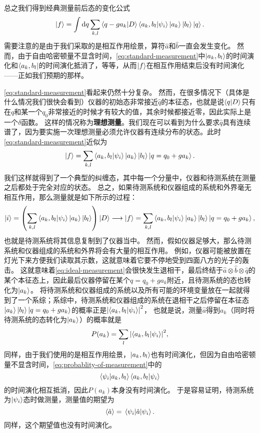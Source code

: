 \documentclass[hyperref, UTF8, a4paper]{ctexart}
\begin{document}
总之我们得到经典测量前后态的变化公式
\begin{equation}
    \ket{f} = \int \dd{q} \sum_{k, l} \braket{q - g a_k}{D} \braket{a_k, b_l}{\psi_i} \ket{a_k} \ket{b_l} \ket{q}.
    \label{eq:standard-measurement}
\end{equation}
需要注意的是由于我们采取的是相互作用绘景，算符$\hat{a}$和$\hat{b}$一直会发生变化。
然而，由于自由哈密顿量不显含时间，\eqref{eq:standard-measurement}中$\ket{a_k, b_l}$的时间演化和$\bra{a_k, b_l}$的时间演化抵消了，等等，从而$\ket{f}$在相互作用结束后没有时间演化——正如我们预期的那样。

\eqref{eq:standard-measurement}看起来仍然十分复杂。
然而，在很多情况下（具体是什么情况我们很快会看到）仪器的初始态非常接近$\hat{q}$的本征态，也就是说$\braket{q}{D}$只有在$q$和某一个$q_0$非常接近的时候才有较大的值，其余时候都接近零，因此实际上是一个$\delta$函数。
这样的情况称为\textbf{理想测量}。我们现在可以看到为什么要求$\hat{q}$具有连续谱了，因为要实施一次理想测量必须允许仪器有连续分布的状态。此时\eqref{eq:standard-measurement}近似为
\begin{equation}
    \ket{f} = \sum_{k, l} \braket{a_k, b_l}{\psi_i} \ket{a_k} \ket{b_l} \ket{q = q_0 + g a_k}.
    \label{eq:ideal-measurement}
\end{equation}
我们这样就得到了一个典型的纠缠态，其中每一个分量中，仪器和待测系统在测量之后都处于完全对应的状态。
总之，如果待测系统和仪器组成的系统和外界毫无相互作用，那么测量就是如下所示的过程：
\[
    \ket{i} = \left(\sum_{k, l} \braket{a_k, b_l}{\psi_i} \ket{a_k} \ket{b_l} \right) \ket{D} \longrightarrow \ket{f} = \sum_{k, l} \braket{a_k, b_l}{\psi_i} \ket{a_k} \ket{b_l} \ket{q = q_0 + g a_k},
\]
也就是待测系统将其信息复制到了仪器当中。
然而，假如仪器足够大，那么待测系统和仪器组成的系统和外界将会有大量的相互作用。
例如，仪器可能被放置在灯光下来方便我们读取其示数，这就意味着它要不停地受到四面八方的光子的轰击。
这就意味着\eqref{eq:ideal-measurement}会很快发生退相干，最后终结于$\hat{a} \otimes \hat{b} \otimes \hat{q}$的某个本征态上，因此最后仪器停留在某个$q=q_0 + g a_k$附近，且待测系统的态也转化为$\ket{a_k}$。
将待测系统和仪器组成的系统以及所有可能的环境变量放在一起就得到了一个系综；系综中，待测系统和仪器组成的系统在退相干之后停留在本征态$\ket{a_k} \ket{b_l} \ket{q = q_0 + g a_k}$的概率正是$\abs{\braket{a_k, b_l}{\psi_i}}^2$，
也就是说，测量$\hat{a}$得到$a_k$（同时将待测系统的态转化为$\ket{a_k}$）的概率就是
\begin{equation}
    P(a_k) = \sum_l \abs{\braket{a_k, b_l}{\psi_i}}^2,
    \label{eq:probablity-of-measurement}
\end{equation}
同样，由于我们使用的是相互作用绘景，$\ket{a_k, b_l}$也有时间演化，但因为自由哈密顿量不显含时间，\eqref{eq:probablity-of-measurement}中的
\[
    \braket{\psi_i}{a_k, b_l} \braket{a_k, b_l}{\psi_i}
\]
的时间演化相互抵消，因此$P(a_k)$本身没有时间演化。
于是容易证明，待测系统为$\ket{\psi_i}$态时做测量，测量值的期望为
\begin{equation}
    \expval{\hat{a}} = \mel{\psi_i}{\hat{a}}{\psi_i}.
\end{equation}
同样，这个期望值也没有时间演化。
\end{document}
